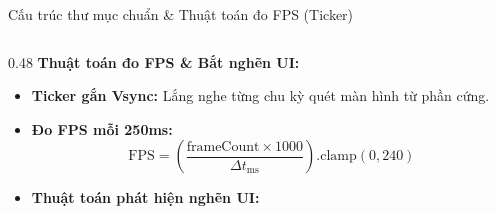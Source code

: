 \documentclass[aspectratio=169, 10pt]{beamer}
\begin{document}
\begin{frame}{Cấu trúc thư mục chuẩn \& Thuật toán đo FPS (Ticker)}
\begin{columns}[t]
    \begin{column}{0.48\textwidth}
      \textbf{Thuật toán đo FPS \& Bắt nghẽn UI:}\\[0.15cm]
      \footnotesize
      \begin{itemize}
        \setlength{\itemsep}{3pt}
        \item \textbf{Ticker gắn Vsync:} Lắng nghe từng chu kỳ quét màn hình từ phần cứng.
        \item \textbf{Đo FPS mỗi 250ms:}
        \vspace{-0.15cm}
        \[
          \text{FPS} = \left(\frac{\text{frameCount} \times 1000}{\Delta t_{\text{ms}}}\right).\text{clamp}(0, 240)
        \]
        \vspace{-0.15cm}
        \item \textbf{Thuật toán phát hiện nghẽn UI:}
        \vspace{0.08cm}
      \end{itemize}
    \end{column}
  \end{columns}
\end{frame}
\end{document}
